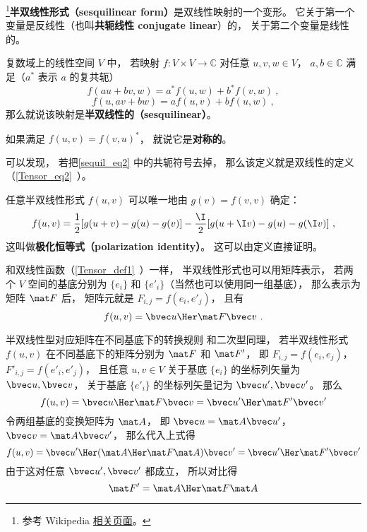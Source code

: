 
\begin{issues}
\issueDraft
\end{issues}

\footnote{参考 Wikipedia \href{https://en.wikipedia.org/wiki/Sesquilinear_form}{相关页面}。}\textbf{半双线性形式（sesquilinear form）}是双线性映射的一个变形。 它关于第一个变量是反线性（也叫\textbf{共轭线性 conjugate linear}）的， 关于第二个变量是线性的。
\begin{definition}{}\label{sequil_def1}
复数域上的线性空间 $V$ 中， 若映射 $f:V\times V\to \mathbb C$ 对任意 $u, v, w\in V$， $a,b\in \mathbb C$ 满足（$a^*$ 表示 $a$ 的复共轭）
\begin{equation}\label{sequil_eq2}
f(au+bv, w) = a^*f(u, w) + b^*f(v, w)~,
\end{equation}
\begin{equation}\label{sequil_eq1}
f(u, av+bw) = af(u, v) + bf(u, w)~,
\end{equation}
那么就说该映射是\textbf{半双线性的（sesquilinear）}。
\end{definition}
如果满足 $f(u, v) = f(v, u)^*$， 就说它是\textbf{对称的}。

可以发现， 若把\autoref{sequil_eq2} 中的共轭符号去掉， 那么该定义就是双线性的定义（\autoref{Tensor_eq2}~）。

任意半双线性形式 $f(u, v)$ 可以唯一地由 $g(v) = f(v, v)$ 确定：
\begin{equation}
f(u, v) =\frac{1}{2}[g(u+v)-g(u)-g(v)]
-\frac{\I}{2}[g(u+\I v)-g(u)-g(\I v)]~,
\end{equation}
这叫做\textbf{极化恒等式（polarization identity）}。 这可以由定义直接证明。

和双线性函数（\autoref{Tensor_def1}~）一样， 半双线性形式也可以用矩阵表示， 若两个 $V$ 空间的基底分别为 $\{e_i\}$ 和 $\{e'_i\}$（当然也可以使用同一组基底）， 那么表示为矩阵 $\mat F$ 后， 矩阵元就是 $F_{i,j} = f(e_i, e'_j)$， 且有
\begin{equation}
f(u, v) = \bvec u\Her \mat F \bvec v~.
\end{equation}

\begin{example}{半双线性型对应矩阵在不同基底下的转换规则}\label{sequil_ex1}
和二次型同理， 若半双线性形式 $f(u, v)$ 在不同基底下的矩阵分别为 $\mat F$ 和 $\mat F'$， 即 $F_{i,j} = f(e_i, e_j)$， $F'_{i,j} = f(e'_i, e'_j)$， 且任意 $u, v\in V$ 关于基底 $\{e_i\}$ 的坐标列矢量为 $\bvec u, \bvec v$， 关于基底 $\{e'_i\}$ 的坐标列矢量记为 $\bvec u', \bvec v'$。 那么
\begin{equation}
f(u, v) = \bvec u\Her \mat F \bvec v = {\bvec u'}\Her \mat F' \bvec v'
\end{equation}
令两组基底的变换矩阵为 $\mat A$， 即 $\bvec u = \mat A\bvec u'$， $\bvec v = \mat A \bvec v'$， 那么代入上式得
\begin{equation}
f(u, v) = {\bvec u'}\Her (\mat A\Her \mat F \mat A) \bvec v' = {\bvec u'}\Her \mat F' \bvec v'
\end{equation}
由于这对任意 $\bvec u', \bvec v'$ 都成立， 所以对比得
\begin{equation}
\mat F' = \mat A\Her \mat F \mat A
\end{equation}
\end{example}
